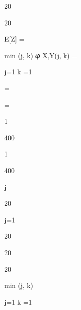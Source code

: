 \documentclass[a4paper,portrait,12pt]{article}
\begin{document}
20





20





\begin{flushleft}
E[Z] =
\end{flushleft}





\begin{flushleft}
min (j, k) 𝜑 X,Y(j, k) =
\end{flushleft}


\begin{flushleft}
j=1 k =1
\end{flushleft}





=





=





1


400


1


400





\begin{flushleft}
j
\end{flushleft}





20


\begin{flushleft}
j=1
\end{flushleft}


20





20





20





\begin{flushleft}
min (j, k)
\end{flushleft}


\begin{flushleft}
j=1 k =1
\end{flushleft}
\end{document}
